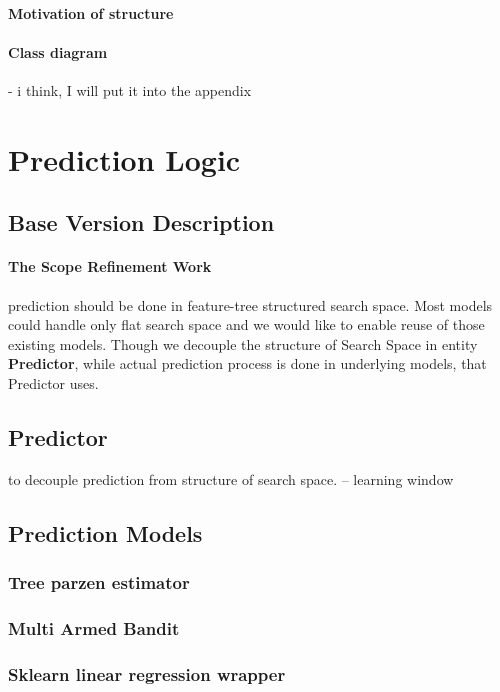 \paragraph{Motivation of structure}
\paragraph{Class diagram} - i think, I will put it into the appendix


\section{Prediction Logic}\label{impl: prediction logic}
\subsection{Base Version Description}
\paragraph{The Scope Refinement Work} prediction should be done in feature-tree structured search space. Most models could handle only flat search space and we would like to enable reuse of those existing models. Though we decouple the structure of Search Space in entity \textbf{Predictor}, while actual prediction process is done in underlying models, that Predictor uses.

\subsection{Predictor}
to decouple prediction from structure of search space.
-- learning window

\subsection{Prediction Models}\label{implementation: prediction models}
\subsubsection{Tree parzen estimator}
\subsubsection{Multi Armed Bandit}
\subsubsection{Sklearn linear regression wrapper}



